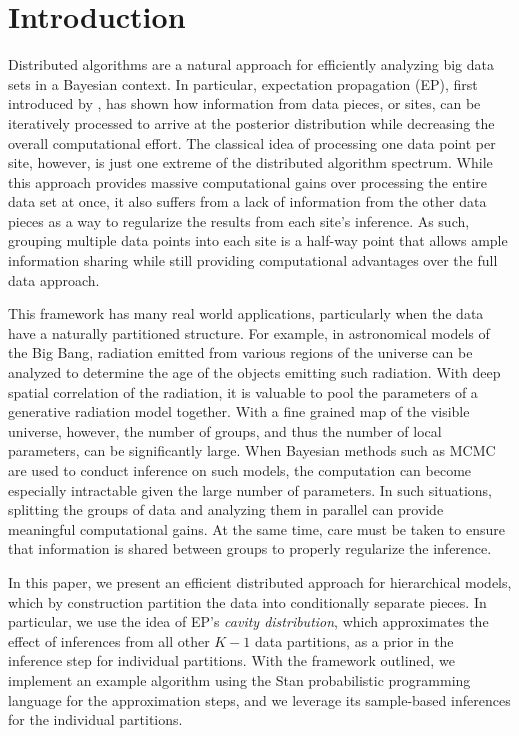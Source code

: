 \section{Introduction}
\label{sec:ep_introduction}

Distributed algorithms are a natural approach for efficiently analyzing big data sets in a Bayesian context. In particular, expectation propagation (EP), first introduced by \citet{Minka:2001a}, has shown how information from data pieces, or sites, can be iteratively processed to arrive at the posterior distribution while decreasing the overall computational effort. The classical idea of processing one data point per site, however, is just one extreme of the distributed algorithm spectrum. While this approach provides massive computational gains over processing the entire data set at once, it also suffers from a lack of information from the other data pieces as a way to regularize the results from each site's inference. As such, grouping multiple data points into each site is a half-way point that allows ample information sharing while still providing computational advantages over the full data approach.

This framework has many real world applications, particularly when the data have a naturally partitioned structure. For example, in astronomical models of the Big Bang, radiation emitted from various regions of the universe can be analyzed to determine the age of the objects emitting such radiation. With deep spatial correlation of the radiation, it is valuable to pool the parameters of a generative radiation model together. With a fine grained map of the visible universe, however, the number of groups, and thus the number of local parameters, can be significantly large. When Bayesian methods such as MCMC are used to conduct inference on such models, the computation can become especially intractable given the large number of parameters. In such situations, splitting the groups of data and analyzing them in parallel can provide meaningful computational gains. At the same time, care must be taken to ensure that information is shared between groups to properly regularize the inference.

In this paper, we present an efficient distributed approach for hierarchical models, which by construction partition the data into conditionally separate pieces. In particular, we use the idea of EP's \emph{cavity distribution}, which approximates the effect of inferences from all other $K-1$ data partitions, as a prior in the inference step for individual partitions. With the framework outlined, we implement an example algorithm using the Stan probabilistic programming language \citep{Stan:2016} for the approximation steps, and we leverage its sample-based inferences for the individual partitions.

